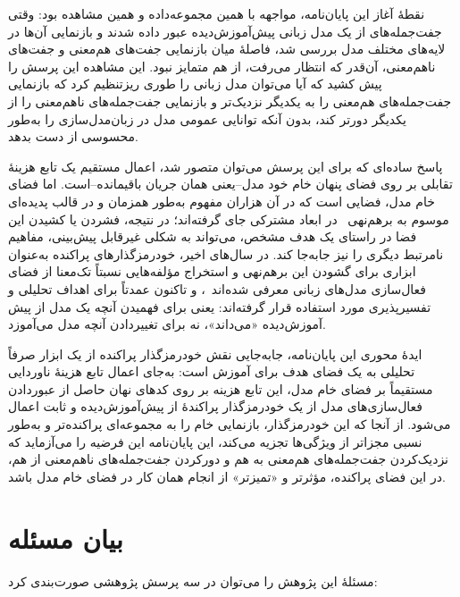 نقطهٔ آغاز این پایان‌نامه، مواجهه با همین مجموعه‌داده و همین مشاهده بود: وقتی جفت‌جمله‌های
از یک مدل زبانی پیش‌آموزش‌دیده عبور داده شدند و بازنمایی آن‌ها در لایه‌های مختلف مدل بررسی شد، فاصلهٔ میان بازنمایی جفت‌های هم‌معنی و جفت‌های ناهم‌معنی، آن‌قدر که انتظار می‌رفت، از هم متمایز نبود. این مشاهده این پرسش را پیش کشید که آیا می‌توان مدل زبانی را طوری ریزتنظیم
کرد که بازنمایی جفت‌جمله‌های هم‌معنی را به یکدیگر نزدیک‌تر و بازنمایی جفت‌جمله‌های ناهم‌معنی را از یکدیگر دورتر کند، بدون آنکه توانایی عمومی مدل در زبان‌مدل‌سازی
را به‌طور محسوسی از دست بدهد.

پاسخ ساده‌ای که برای این پرسش می‌توان متصور شد، اعمال مستقیم یک تابع هزینهٔ تقابلی
بر روی فضای پنهان
خام خود مدل--یعنی همان جریان باقیمانده--است. اما فضای خام مدل، فضایی است که در آن هزاران مفهوم به‌طور همزمان و در قالب پدیده‌ای موسوم به برهم‌نهی~\cite{elhage2022superposition}
در ابعاد مشترکی جای گرفته‌اند؛ در نتیجه، فشردن یا کشیدن این فضا در راستای یک هدف مشخص، می‌تواند به شکلی غیرقابل پیش‌بینی، مفاهیم نامرتبط دیگری را نیز جابه‌جا کند. در سال‌های اخیر، خودرمزگذارهای پراکنده
به‌عنوان ابزاری برای گشودن این برهم‌نهی و استخراج مؤلفه‌هایی نسبتاً تک‌معنا
از فضای فعال‌سازی مدل‌های زبانی معرفی شده‌اند~\cite{bricken2023monosemanticity,cunningham2023sae}، و تاکنون عمدتاً برای اهداف تحلیلی و تفسیرپذیری
مورد استفاده قرار گرفته‌اند: یعنی برای فهمیدن آنچه یک مدل از پیش آموزش‌دیده «می‌داند»، نه برای تغییردادن آنچه مدل می‌آموزد.

ایدهٔ محوری این پایان‌نامه، جابه‌جایی نقش خودرمزگذار پراکنده از یک ابزار صرفاً تحلیلی به یک فضای هدف برای آموزش است: به‌جای اعمال تابع هزینهٔ ناوردایی
مستقیماً بر فضای خام مدل، این تابع هزینه بر روی کدهای نهان حاصل از عبوردادن فعال‌سازی‌های مدل از یک خودرمزگذار پراکندهٔ از پیش‌آموزش‌دیده و ثابت
اعمال می‌شود. از آنجا که این خودرمزگذار، بازنمایی خام را به مجموعه‌ای پراکنده‌تر و به‌طور نسبی مجزاتر از ویژگی‌ها
تجزیه می‌کند، این پایان‌نامه این فرضیه را می‌آزماید که نزدیک‌کردن جفت‌جمله‌های هم‌معنی به هم و دورکردن جفت‌جمله‌های ناهم‌معنی از هم، در این فضای پراکنده، مؤثرتر و «تمیزتر» از انجام همان کار در فضای خام مدل باشد.

\section{بیان مسئله}
مسئلهٔ این پژوهش را می‌توان در سه پرسش پژوهشی صورت‌بندی کرد:

